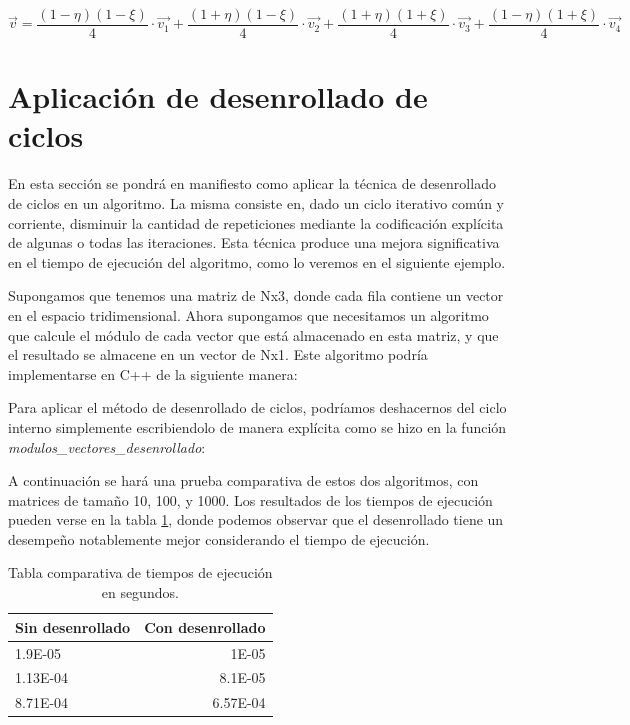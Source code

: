 \begin{equation}
\label{eq:vdechieta}  
  \vec{v} = 
  \frac{ (1-\eta)(1-\xi) }{4} \cdot \vec{v_1} + 
  \frac{ (1+\eta)(1-\xi) }{4} \cdot \vec{v_2} + 
  \frac{ (1+\eta)(1+\xi) }{4} \cdot \vec{v_3} +  
  \frac{ (1-\eta)(1+\xi) }{4} \cdot \vec{v_4} 
\end{equation} 

\section{Aplicación de desenrollado de ciclos}
\label{sec:desenrollado}

En esta sección se pondrá en manifiesto como aplicar la técnica de
desenrollado de ciclos en un algoritmo. La misma consiste en, dado un
ciclo iterativo común y corriente, disminuir la cantidad de
repeticiones mediante la codificación explícita de algunas o todas las
iteraciones. Esta técnica produce una mejora significativa en el
tiempo de ejecución del algoritmo, como lo veremos en el siguiente
ejemplo.

Supongamos que tenemos una matriz de Nx3, donde cada fila contiene un
vector en el espacio tridimensional. Ahora supongamos que necesitamos
un algoritmo que calcule el módulo de cada vector que está almacenado
en esta matriz, y que el resultado se almacene en un vector de
Nx1. Este algoritmo podría implementarse en C++ de la siguiente
manera:

 
Para aplicar el método de desenrollado de ciclos, podríamos
deshacernos del ciclo interno simplemente escribiendolo de manera
explícita como se hizo en la función
\emph{modulos\_vectores\_desenrollado}:


A continuación se hará una prueba comparativa de estos dos algoritmos,
con matrices de tamaño 10, 100, y 1000. Los resultados de los tiempos
de ejecución pueden verse en la tabla \ref{tab:resultados}, donde
podemos observar que el desenrollado tiene un desempeño
notablemente mejor considerando el tiempo de ejecución.

\begin{table}[H]
  \centering
  \begin{tabular}{l|r}
    Sin desenrollado & Con desenrollado \\\hline
    1.9E-05 & 1E-05 \\
    1.13E-04 & 8.1E-05 \\
    8.71E-04 & 6.57E-04
  \end{tabular}
  \caption{\label{tab:resultados}Tabla comparativa de tiempos de
    ejecución en segundos.}
\end{table}

